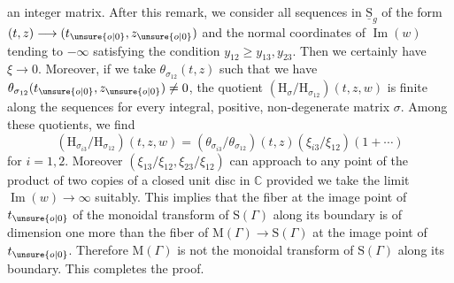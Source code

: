 




an integer matrix. After this remark, we consider all sequences in $\underline{\mathrm{S}}_g$ of the form $(t,z)\longrightarrow(t_{\unsure{o|0}},z_{\unsure{o|0}})$ and the normal coordinates of $\operatorname{Im}(w)$ tending to $-\infty$ satisfying the condition $y_{12}\geq y_{13},y_{23}$. Then we certainly have $\xi\longrightarrow0$. Moreover, if we take $\theta_{\sigma_{12}}(t,z)$ such that we have $\theta_{\sigma_{12}}(t_{\unsure{o|0}},z_{\unsure{o|0}})\neq0$, the quotient $(\mathrm{H}_\sigma/\mathrm{H}_{\sigma_{12}})(t,z,w)$ is finite along the sequences for every integral, positive, non-degenerate matrix $\sigma$. Among these quotients, we find
\[
(\mathrm{H}_{\sigma_{i3}}/\mathrm{H}_{\sigma_{12}})(t,z,w)=(\theta_{\sigma_{i3}}/\theta_{\sigma_{12}})(t,z)(\xi_{i3}/\xi_{12})(1+\cdots)
\]
for $i=1,2$. Moreover $(\xi_{13}/\xi_{12},\xi_{23}/\xi_{12})$ can approach to any point of the product of two copies of a closed unit disc in $\mathbb{C}$ provided we take the limit $\operatorname{Im}(w)\longrightarrow\infty$ suitably. This implies that the fiber at the image point of $t_{\unsure{o|0}}$ of the monoidal transform of $\mathrm{S}(\Gamma)$ along its boundary is of dimension one more than the fiber of $\mathrm{M}(\Gamma)\longrightarrow\mathrm{S}(\Gamma)$ at the image point of $t_{\unsure{o|0}}$. Therefore $\mathrm{M}(\Gamma)$ is not the monoidal transform of $\mathrm{S}(\Gamma)$ along its boundary. This completes the proof.

